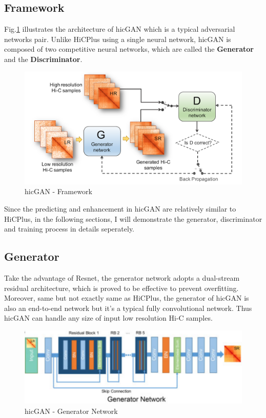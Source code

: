 \documentclass{article}
\begin{document}
\subsection{Framework}

Fig.\ref{hicganframe} illustrates the architecture of hicGAN which is a typical adversarial networks pair. Unlike HiCPlus using a single neural network, hicGAN is composed of two competitive neural networks, which are called the \textbf{Generator} and the \textbf{Discriminator}.

\begin{figure}[H]
    \centering
    \includegraphics[scale=0.3]{./docs/hicgan_frame.png}
    \caption{hicGAN - Framework}\label{hicganframe}
\end{figure}

Since the predicting and enhancement in hicGAN are relatively similar to HiCPlus, in the following sections, I will demonstrate the generator, discriminator and training process in details seperately.

\subsection{Generator}

Take the advantage of Resnet, the generator network adopts a dual-stream residual architecture, which is proved\cite{resnet} to be effective to prevent overfitting. Moreover, same but not exactly same as HiCPlus, the generator of hicGAN is also an end-to-end network but it's a typical fully convolutional network. Thus hicGAN can handle any size of input low resolution Hi-C samples.

\begin{figure}[H]
    \centering
    \includegraphics[scale=0.3]{./docs/hicgan_generator.png}
    \caption{hicGAN - Generator Network}
\end{figure}
\end{document}
